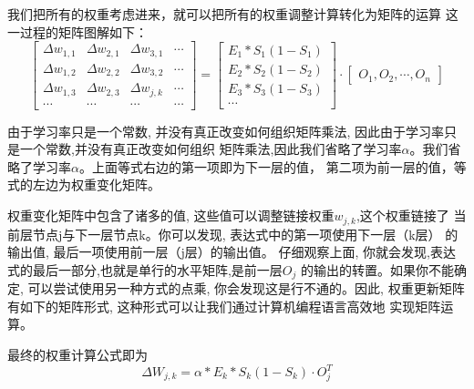 \documentclass[12pt]{article}
\begin{document}
    我们把所有的权重考虑进来，就可以把所有的权重调整计算转化为矩阵的运算
    这一过程的矩阵图解如下：
    \begin{equation}
            \begin{bmatrix}
                \Delta w_{1,1} & \Delta w_{2,1} & \Delta w_{3,1} & \cdots\\
                \Delta w_{1,2} & \Delta w_{2,2} & \Delta w_{3,2} & \cdots\\
                \Delta w_{1,3} & \Delta w_{2,3} & \Delta w_{j,k} & \cdots \\
                \cdots         & \cdots         & \cdots         & \cdots
            \end{bmatrix}
                =
            \begin{bmatrix}
                E_{1} * S_{1}\left(1-S_{1}\right) \\
                E_{2} * S_{2}\left(1-S_{2}\right) \\
                E_{3} * S_{3}\left(1-S_{3}\right) \\
                \cdots 
            \end{bmatrix}
                \cdot 
            \begin{bmatrix}  
                O_1,O_2,\cdots ,O_n
            \end{bmatrix}
    \end{equation}
    
    由于学习率只是一个常数, 并没有真正改变如何组织矩阵乘法, 因此由于学习率只是一个常数,并没有真正改变如何组织
    矩阵乘法,因此我们省略了学习率$\alpha$。我们省略了学习率$\alpha$。上面等式右边的第一项即为下一层的值，
    第二项为前一层的值，等式的左边为权重变化矩阵。

    权重变化矩阵中包含了诸多的值, 这些值可以调整链接权重$w_{j,k}$,这个权重链接了
    当前层节点j与下一层节点k。你可以发现, 表达式中的第一项使用下一层（k层）
    的输出值, 最后一项使用前一层（j层）的输出值。
    仔细观察上面, 你就会发现,表达式的最后一部分,也就是单行的水平矩阵,是前一层$O_j$
    的输出的转置。如果你不能确定, 可以尝试使用另一种方式的点乘, 
    你会发现这是行不通的。因此, 权重更新矩阵有如下的矩阵形式, 这种形式可以让我们通过计算机编程语言高效地
    实现矩阵运算。
    
    最终的权重计算公式即为
    \begin{equation}
        \boxed
        {
        \Delta W_{j, k}=\alpha * E_{k} * S_{k}\left(1-S_{k}\right) \cdot O_{j}^{T}
        }
    \end{equation}
    
\end{document}
